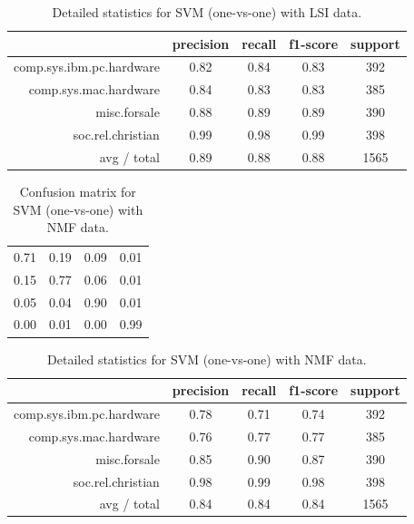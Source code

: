 \documentclass[letterpaper]{article}
\begin{document}
\begin{table}[H]
\centering
\begin{tabular}{r|cccc}
& precision & recall & f1-score & support \\ \hline
comp.sys.ibm.pc.hardware & 0.82 & 0.84 & 0.83 & 392 \\
comp.sys.mac.hardware & 0.84 & 0.83 & 0.83 & 385 \\
misc.forsale & 0.88 & 0.89 & 0.89 & 390 \\
soc.rel.christian & 0.99 & 0.98 & 0.99 & 398 \\
avg / total & 0.89 & 0.88 & 0.88 & 1565 \\
\end{tabular}
\caption{Detailed statistics for SVM (one-vs-one) with LSI data.}
\end{table}

\begin{table}[H]
\centering
\begin{tabular}{cccc}
0.71 & 0.19 & 0.09 & 0.01 \\
0.15 & 0.77 & 0.06 & 0.01 \\
0.05 & 0.04 & 0.90 & 0.01 \\
0.00 & 0.01 & 0.00 & 0.99
\end{tabular}
\caption{Confusion matrix for SVM (one-vs-one) with NMF data.}
\end{table}

\begin{table}[H]
\centering
\begin{tabular}{r|cccc}
& precision & recall & f1-score & support \\ \hline
comp.sys.ibm.pc.hardware & 0.78 & 0.71 & 0.74 & 392 \\
comp.sys.mac.hardware & 0.76 & 0.77 & 0.77 & 385 \\
misc.forsale & 0.85 & 0.90 & 0.87 & 390 \\
soc.rel.christian & 0.98 & 0.99 & 0.98 & 398 \\
avg / total & 0.84 & 0.84 & 0.84 & 1565 \\
\end{tabular}
\caption{Detailed statistics for SVM (one-vs-one) with NMF data.}
\end{table}
\end{document}

